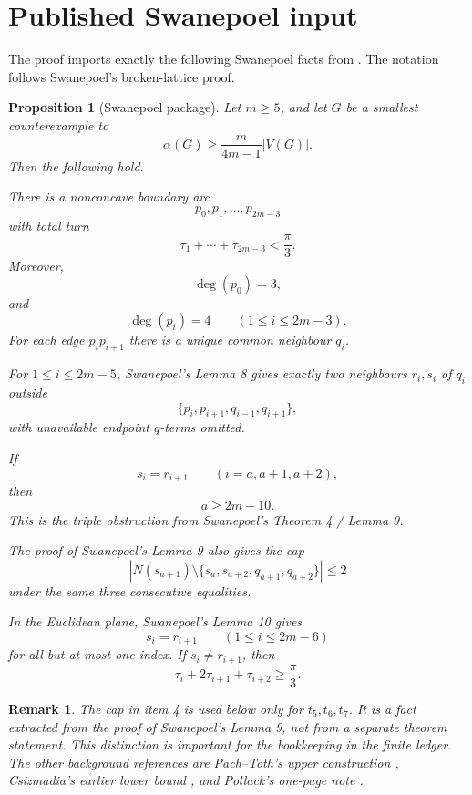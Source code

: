 \documentclass[11pt]{article}
\newtheorem{proposition}{Proposition}
\newtheorem{remark}{Remark}
\begin{document}
\section{Published Swanepoel input}

The proof imports exactly the following Swanepoel facts from \cite{Swanepoel2002}.  The notation follows Swanepoel's broken-lattice proof.

\begin{proposition}[Swanepoel package]\label{prop:swanepoel}
Let $m\ge 5$, and let $G$ be a smallest counterexample to
\[
  \alpha(G)\ge \frac{m}{4m-1}|V(G)|.
\]
Then the following hold.

\begin{lamport}
\item There is a nonconcave boundary arc
\[
  p_0,p_1,\ldots,p_{2m-3}
\]
with total turn
\[
  \tau_1+\cdots+\tau_{2m-3}<\frac{\pi}{3}.
\]
Moreover,
\[
  \deg(p_0)=3,
\]
and
\[
  \deg(p_i)=4\qquad(1\le i\le 2m-3).
\]
For each edge $p_ip_{i+1}$ there is a unique common neighbour $q_i$.

\item For $1\le i\le 2m-5$, Swanepoel's Lemma 8 gives exactly two neighbours $r_i,s_i$ of $q_i$ outside
\[
  \{p_i,p_{i+1},q_{i-1},q_{i+1}\},
\]
with unavailable endpoint $q$-terms omitted.

\item If
\[
  s_i=r_{i+1}\qquad(i=a,a+1,a+2),
\]
then
\[
  a\ge 2m-10.
\]
This is the triple obstruction from Swanepoel's Theorem 4 / Lemma 9.

\item The proof of Swanepoel's Lemma 9 also gives the cap
\[
 \left|N(s_{a+1})\setminus\{s_a,s_{a+2},q_{a+1},q_{a+2}\}\right|\le 2
\]
under the same three consecutive equalities.

\item In the Euclidean plane, Swanepoel's Lemma 10 gives
\[
  s_i=r_{i+1}\qquad(1\le i\le 2m-6)
\]
for all but at most one index.  If $s_i\ne r_{i+1}$, then
\[
  \tau_i+2\tau_{i+1}+\tau_{i+2}\ge \frac{\pi}{3}.
\]
\end{lamport}
\end{proposition}

\begin{remark}
The cap in item 4 is used below only for $t_5,t_6,t_7$.  It is a fact extracted from the proof of Swanepoel's Lemma 9, not from a separate theorem statement.  This distinction is important for the bookkeeping in the finite ledger.  The other background references are Pach--Toth's upper construction \cite{PachToth1996}, Csizmadia's earlier lower bound \cite{Csizmadia1998}, and Pollack's one-page note \cite{Pollack1985}.
\end{remark}
\end{document}
